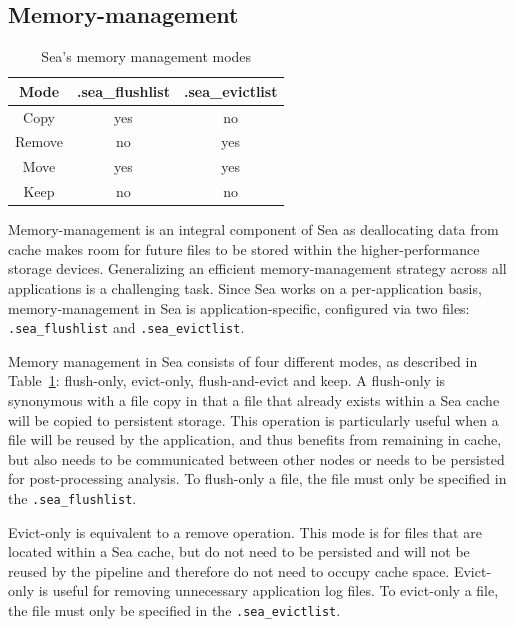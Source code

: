 \documentclass[10pt,journal,compsoc]{IEEEtran}
\newcommand{\todo}[1]{\marginpar{\parbox{18mm}{\flushleft\tiny\color{red}\textbf{TODO}:
#1}}}
\begin{document}
\subsection{Memory-management}
      \begin{table}
      \centering
      \begin{tabular}{ccc}
        \toprule
       Mode & .sea\_flushlist & .sea\_evictlist \\
       \midrule
       Copy & yes & no \\
       Remove & no & yes \\
       Move & yes & yes \\
       Keep & no & no \\

       \bottomrule

      \end{tabular}
      \caption{Sea's memory management modes}
      \label{table:sea-comp:fe}
      \end{table}
Memory-management is an integral component of Sea as deallocating data from cache
makes room for future files to be stored within the higher-performance storage devices.
Generalizing an efficient memory-management strategy across all applications is a challenging task.
Since Sea works on a per-application basis, memory-management in Sea is application-specific, configured
via two files: \texttt{.sea\_flushlist} and \texttt{.sea\_evictlist}.

Memory management in Sea consists of four different modes, as described in Table~\ref{table:sea-comp:fe}: flush-only,
evict-only, flush-and-evict and keep. A flush-only is synonymous with a file
copy in that a file that already exists within a Sea cache will be copied to
persistent storage. This operation is particularly useful when a file will be
reused by the application, and thus benefits from remaining in cache, but also
needs to be communicated between other nodes or needs to be persisted for
post-processing analysis. To flush-only a file, the file must only be specified
in the \texttt{.sea\_flushlist}.

Evict-only is equivalent to a remove operation. This mode is for files that are
located within a Sea cache, but do not need to be persisted and will not be
reused by the pipeline and therefore do not need to occupy cache space.
Evict-only is useful for removing unnecessary application log files. To
evict-only a file, the file must only be specified in the
\texttt{.sea\_evictlist}.
\end{document}
